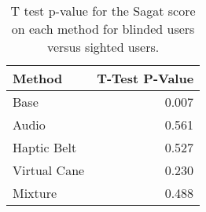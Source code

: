 
\begin{table}[!htb]
\centering
\caption{T test p-value for the Sagat score on each method for blinded users versus sighted users.}
\label{tab:ttest_sagat_score}
\begin{tabular}{lr}
\toprule
      Method &  T-Test P-Value \\
\midrule
        Base &           0.007 \\
       Audio &           0.561 \\
 Haptic Belt &           0.527 \\
Virtual Cane &           0.230 \\
     Mixture &           0.488 \\
\bottomrule
\end{tabular}
\end{table}

